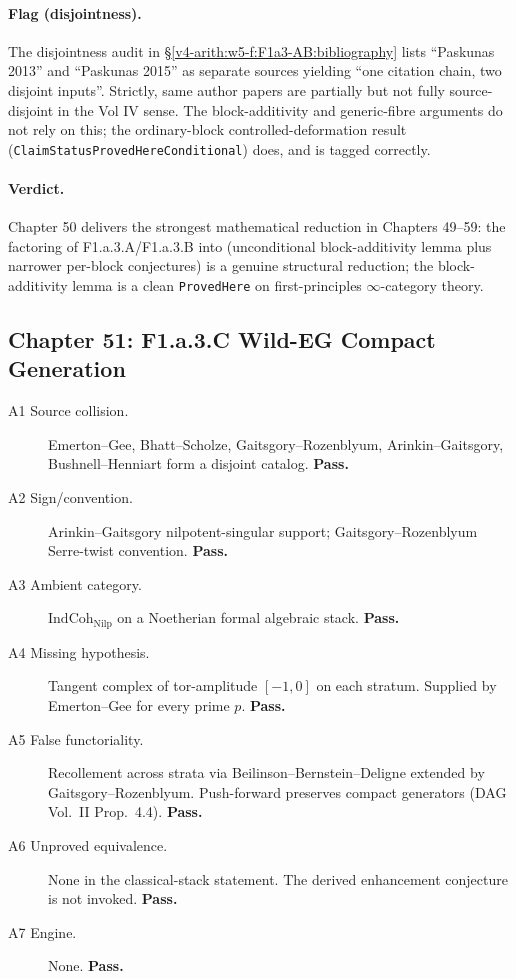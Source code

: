 \paragraph{Flag (disjointness).}
The disjointness audit in \S\ref{v4-arith:w5-f:F1a3-AB:bibliography}
lists ``Paskunas 2013'' and ``Paskunas 2015'' as separate sources
yielding ``one citation chain, two disjoint inputs''. Strictly, same
author papers are partially but not fully source-disjoint in the
Vol IV sense. The block-additivity and generic-fibre arguments do
not rely on this; the ordinary-block controlled-deformation result
(\texttt{ClaimStatusProvedHereConditional}) does, and is tagged
correctly.

\paragraph{Verdict.} Chapter 50 delivers the strongest mathematical
reduction in Chapters 49--59: the factoring of F1.a.3.A/F1.a.3.B
into (unconditional block-additivity lemma plus narrower per-block
conjectures) is a genuine structural reduction; the block-additivity
lemma is a clean \texttt{ProvedHere} on first-principles
\(\infty\)-category theory.

\subsection{Chapter 51: F1.a.3.C Wild-EG Compact Generation}
\label{v4-arith:w6-j:ch51}

\begin{description}
\item[A1 Source collision.] Emerton--Gee, Bhatt--Scholze,
Gaitsgory--Rozenblyum, Arinkin--Gaitsgory, Bushnell--Henniart form
a disjoint catalog. \textbf{Pass.}
\item[A2 Sign/convention.] Arinkin--Gaitsgory nilpotent-singular
support; Gaitsgory--Rozenblyum Serre-twist convention. \textbf{Pass.}
\item[A3 Ambient category.] \(\mathrm{IndCoh}_{\mathrm{Nilp}}\) on a
Noetherian formal algebraic stack. \textbf{Pass.}
\item[A4 Missing hypothesis.] Tangent complex of tor-amplitude
\([-1,0]\) on each stratum. Supplied by Emerton--Gee for every prime
\(p\). \textbf{Pass.}
\item[A5 False functoriality.] Recollement across strata via
Beilinson--Bernstein--Deligne extended by Gaitsgory--Rozenblyum.
Push-forward preserves compact generators (DAG Vol.~II Prop.~4.4).
\textbf{Pass.}
\item[A6 Unproved equivalence.] None in the classical-stack
statement. The derived enhancement conjecture
 is not invoked.
\textbf{Pass.}
\item[A7 Engine.] None. \textbf{Pass.}
\end{description}

